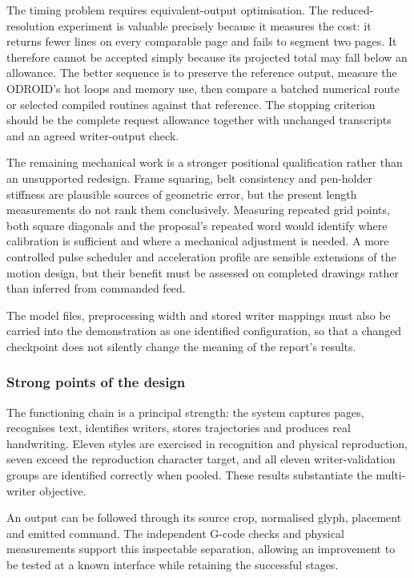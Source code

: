 The timing problem requires equivalent-output optimisation. The reduced-resolution experiment is valuable precisely because it measures the cost: it returns fewer lines on every comparable page and fails to segment two pages. It therefore cannot be accepted simply because its projected total may fall below an allowance. The better sequence is to preserve the reference output, measure the ODROID's hot loops and memory use, then compare a batched numerical route or selected compiled routines against that reference. The stopping criterion should be the complete request allowance together with unchanged transcripts and an agreed writer-output check.

The remaining mechanical work is a stronger positional qualification rather than an unsupported redesign. Frame squaring, belt consistency and pen-holder stiffness are plausible sources of geometric error, but the present length measurements do not rank them conclusively. Measuring repeated grid points, both square diagonals and the proposal's repeated word would identify where calibration is sufficient and where a mechanical adjustment is needed. A more controlled pulse scheduler and acceleration profile are sensible extensions of the motion design, but their benefit must be assessed on completed drawings rather than inferred from commanded feed.

The model files, preprocessing width and stored writer mappings must also be carried into the demonstration as one identified configuration, so that a changed checkpoint does not silently change the meaning of the report's results.

\subsubsection{Strong points of the design}
\label{sec:dis-strengths}
The functioning chain is a principal strength: the system captures pages, recognises text, identifies writers, stores trajectories and produces real handwriting. Eleven styles are exercised in recognition and physical reproduction, seven exceed the reproduction character target, and all eleven writer-validation groups are identified correctly when pooled. These results substantiate the multi-writer objective.

An output can be followed through its source crop, normalised glyph, placement and emitted command. The independent G-code checks and physical measurements support this inspectable separation, allowing an improvement to be tested at a known interface while retaining the successful stages.

